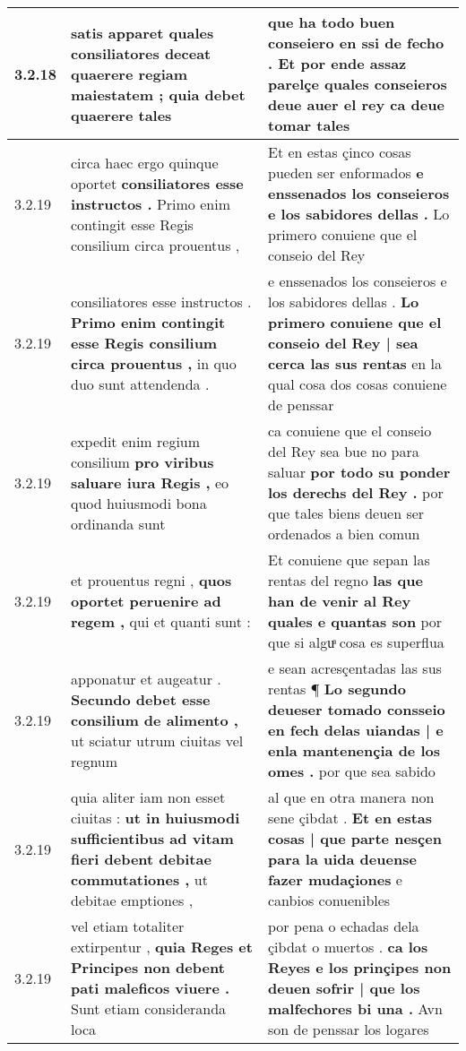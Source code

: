 \begin{tabular}{|p{1cm}|p{6.5cm}|p{6.5cm}|}
3.2.18 & satis apparet quales consiliatores deceat \textbf{ quaerere regiam maiestatem ; } quia debet quaerere tales & que ha todo buen conseiero en ssi de fecho . \textbf{ Et por ende assaz parelçe quales conseieros deue auer el rey } ca deue tomar tales \\\hline
3.2.19 & circa haec ergo quinque oportet \textbf{ consiliatores esse instructos . } Primo enim contingit esse Regis consilium circa prouentus , & Et en estas çinco cosas pueden ser enformados \textbf{ e enssenados los conseieros e los sabidores dellas . } Lo primero conuiene que el conseio del Rey \\\hline
3.2.19 & consiliatores esse instructos . \textbf{ Primo enim contingit esse Regis consilium circa prouentus , } in quo duo sunt attendenda . & e enssenados los conseieros e los sabidores dellas . \textbf{ Lo primero conuiene que el conseio del Rey | sea cerca las sus rentas } en la qual cosa dos cosas conuiene de penssar \\\hline
3.2.19 & expedit enim regium consilium \textbf{ pro viribus saluare iura Regis , } eo quod huiusmodi bona ordinanda sunt & ca conuiene que el conseio del Rey sea bue no para saluar \textbf{ por todo su ponder los derechs del Rey . } por que tales biens deuen ser ordenados a bien comun \\\hline
3.2.19 & et prouentus regni , \textbf{ quos oportet peruenire ad regem , } qui et quanti sunt : & Et conuiene que sepan las rentas del regno \textbf{ las que han de venir al Rey quales e quantas son } por que si alguͣ cosa es superflua \\\hline
3.2.19 & apponatur et augeatur . \textbf{ Secundo debet esse consilium de alimento , } ut sciatur utrum ciuitas vel regnum & e sean acresçentadas las sus rentas ¶ \textbf{ Lo segundo deueser tomado consseio en fech delas uiandas | e enla mantenençia de los omes . } por que sea sabido \\\hline
3.2.19 & quia aliter iam non esset ciuitas : \textbf{ ut in huiusmodi sufficientibus ad vitam fieri debent debitae commutationes , } ut debitae emptiones , & al que en otra manera non sene çibdat . \textbf{ Et en estas cosas | que parte nesçen para la uida deuense fazer mudaçiones } e canbios conuenibles \\\hline
3.2.19 & vel etiam totaliter extirpentur , \textbf{ quia Reges et Principes non debent pati maleficos viuere . } Sunt etiam consideranda loca & por pena o echadas dela çibdat o muertos . \textbf{ ca los Reyes e los prinçipes non deuen sofrir | que los malfechores bi una . } Avn son de penssar los logares \\\hline

\end{tabular}
